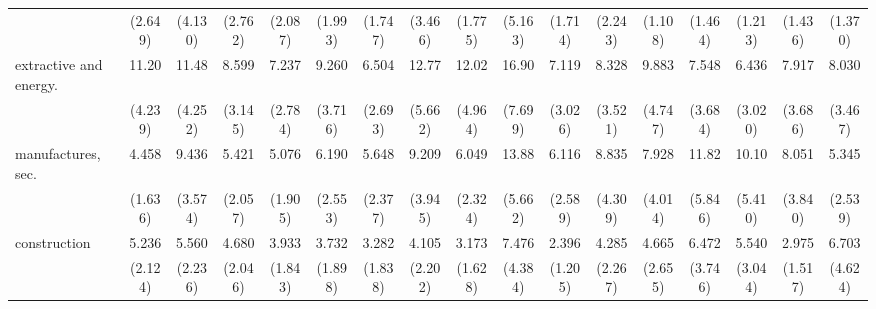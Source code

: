 {\begin{tabular}{l*{16}{c}}
                    &     (2.649)         &     (4.130)         &     (2.762)         &     (2.087)         &     (1.993)         &     (1.747)         &     (3.466)         &     (1.775)         &     (5.163)         &     (1.714)         &     (2.243)         &     (1.108)         &     (1.464)         &     (1.213)         &     (1.436)         &     (1.370)         \\
[1em]
extractive and energy.&       11.20\sym{***}&       11.48\sym{***}&       8.599\sym{***}&       7.237\sym{***}&       9.260\sym{***}&       6.504\sym{***}&       12.77\sym{***}&       12.02\sym{***}&       16.90\sym{***}&       7.119\sym{***}&       8.328\sym{***}&       9.883\sym{***}&       7.548\sym{***}&       6.436\sym{***}&       7.917\sym{***}&       8.030\sym{***}\\
                    &     (4.239)         &     (4.252)         &     (3.145)         &     (2.784)         &     (3.716)         &     (2.693)         &     (5.662)         &     (4.964)         &     (7.699)         &     (3.026)         &     (3.521)         &     (4.747)         &     (3.684)         &     (3.020)         &     (3.686)         &     (3.467)         \\
[1em]
manufactures, sec.  &       4.458\sym{***}&       9.436\sym{***}&       5.421\sym{***}&       5.076\sym{***}&       6.190\sym{***}&       5.648\sym{***}&       9.209\sym{***}&       6.049\sym{***}&       13.88\sym{***}&       6.116\sym{***}&       8.835\sym{***}&       7.928\sym{***}&       11.82\sym{***}&       10.10\sym{***}&       8.051\sym{***}&       5.345\sym{***}\\
                    &     (1.636)         &     (3.574)         &     (2.057)         &     (1.905)         &     (2.553)         &     (2.377)         &     (3.945)         &     (2.324)         &     (5.662)         &     (2.589)         &     (4.309)         &     (4.014)         &     (5.846)         &     (5.410)         &     (3.840)         &     (2.539)         \\
[1em]
construction        &       5.236\sym{***}&       5.560\sym{***}&       4.680\sym{***}&       3.933\sym{**} &       3.732\sym{**} &       3.282\sym{*}  &       4.105\sym{**} &       3.173\sym{*}  &       7.476\sym{***}&       2.396         &       4.285\sym{**} &       4.665\sym{**} &       6.472\sym{**} &       5.540\sym{**} &       2.975\sym{*}  &       6.703\sym{**} \\
                    &     (2.124)         &     (2.236)         &     (2.046)         &     (1.843)         &     (1.898)         &     (1.838)         &     (2.202)         &     (1.628)         &     (4.384)         &     (1.205)         &     (2.267)         &     (2.655)         &     (3.746)         &     (3.044)         &     (1.517)         &     (4.624)         \\

\end{tabular}}
